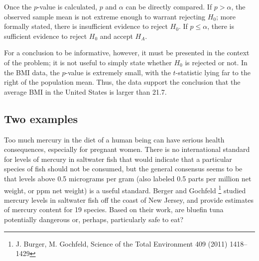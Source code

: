 \begin{spacing}{1.5}
Once the $p$-value is calculated, $p$ and $\alpha$ can be directly compared. If $p > \alpha$, the observed sample mean is not extreme enough to warrant rejecting $H_0$; more formally stated, there is insufficient evidence to reject $H_0$. If $p \leq \alpha$, there is sufficient evidence to reject $H_0$ and accept $H_A$. 

For a conclusion to be informative, however, it must be presented in the context of the problem; it is not useful to simply state whether $H_0$ is rejected or not. In the  BMI data, the $p$-value is extremely small, with the $t$-statistic lying far to the right of the population mean. Thus, the data support the conclusion that the average BMI in the United States is larger than 21.7. 



\subsection{Two examples}

\begin{example}
	
Too much mercury in the diet of a human being can have serious health consequences, especially for pregnant women.  There is no international standard for levels of mercury in saltwater fish that would indicate that a particular species of fish should not be consumed, but the general consensus seems to be that levels above 0.5 micrograms per gram (also labeled 0.5 parts per million net weight, or ppm net weight) is a useful standard. Berger and Gochfeld \footnote{J. Burger, M. Gochfeld, Science of the Total Environment 409 (2011) 1418–1429} studied mercury levels in saltwater fish off the coast of New Jersey, and provide estimates of mercury content for 19 species.  Based on their work, are bluefin tuna potentially dangerous or, perhaps, particularly safe to eat?


\end{example}
\end{spacing}
